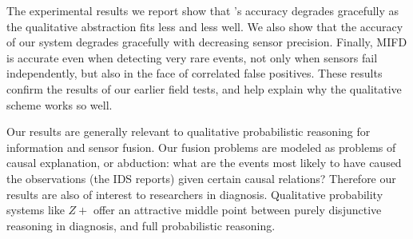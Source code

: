 %
%

The experimental results we report show that \zplus{}'s accuracy degrades
gracefully as the qualitative abstraction fits less and less well. We also show
that the accuracy of our system degrades gracefully with decreasing sensor
precision. Finally, MIFD is accurate even when detecting very rare events,
not only when sensors fail independently, but also in
the face of correlated false positives.
These results confirm the results of our
earlier field tests, and help explain why the
qualitative scheme works so well.



Our results are generally
relevant to qualitative probabilistic reasoning for
information and sensor fusion.
Our fusion problems are modeled as problems of causal explanation, or abduction:
what are the events most likely to have caused the observations (the IDS
reports) given certain causal relations?
Therefore our results are also of interest to researchers in diagnosis.
Qualitative probability systems like $Z+$ offer an attractive middle point between
purely disjunctive reasoning in diagnosis, and full probabilistic reasoning.

